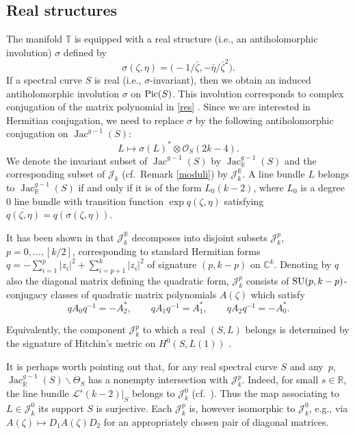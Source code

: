 \documentclass[pdftex]{sigma}
\newcommand{\cx}{{\mathbb C}}
\newcommand{\Jac}{\operatorname{Jac}}
\newcommand{\ol}{\overline}
\numberwithin{equation}{section}
\newcommand{\oR}{{\mathbb{R}}}
\newcommand{\oT}{{\mathbb{T}}}
\newcommand{\sO}{{\mathcal{O}}}
\begin{document}
\subsection{Real structures} The manifold $\oT$ is equipped with a real structure (i.e., an antiholomorphic involution) $\sigma$ defined by
\[
\sigma(\zeta,\eta)=\bigl(-1/\bar\zeta,-\bar\eta/\bar\zeta^2\bigr).
\]
If a spectral curve $S$ is real (i.e., $\sigma$-invariant), then we obtain an induced antiholomorphic involution $\sigma$ on ${\rm Pic}(S)$. This involution corresponds to complex conjugation of the matrix polynomial in \eqref{res} \cite[Section~1.2]{theta}. Since we are interested in Hermitian conjugation, we need to replace $\sigma$ by the following antiholomorphic conjugation on $\Jac^{g-1}(S)$:
\[
L\mapsto\sigma(L)^\ast\otimes \sO_S(2k-4).
\]
We denote the invariant subset of $\Jac^{g-1}(S)$ by $\Jac^{g-1}_\oR(S)$ and the corresponding subset of $\mathscr{J}_k$ (cf.\ Remark \ref{moduli})
by $\mathscr{J}_k^\oR$. A line bundle $L$ belongs to $\Jac^{g-1}_\oR(S)$ if and only if it is of the form $L_0(k-2)$, where $L_0$ is a degree $0$ line bundle with transition function $\exp q(\zeta,\eta)$ satisfying $\ol{q(\zeta,\eta)}=q(\sigma(\zeta,\eta))$.

It has been shown in \cite[Proposition~1.7]{theta} that $\mathscr{J}_k^\oR$ decomposes into disjoint subsets $\mathscr{J}_k^p$, $p=0,\dots,[k/2]$,
corresponding to standard Hermitian forms $q=-\sum_{i=1}^p |z_i|^2+\sum_{i=p+1}^k|z_i|^2$ of signature $(p,k-p)$ on $\cx^k$. Denoting by $q$ also the diagonal matrix defining the quadratic form, $\mathscr{J}_k^p$ consists of ${\rm SU}(p,k-p)$-conjugacy classes of quadratic matrix polynomials $A(\zeta)$ which satisfy
\[
qA_0q^{-1}=-A_2^\ast,\qquad qA_1q^{-1}=A_1^\ast,\qquad qA_2q^{-1}=-A_0^\ast.
\]

\begin{Remark} Equivalently, the component $\mathscr{J}_k^p$ to which a real $(S,L)$ belongs is determined by the signature of Hitchin's metric on $H^0(S,L(1))$ \cite[Section~6]{Hit}.
\end{Remark}
\begin{Remark} It is perhaps worth pointing out that, for any real spectral curve $S$ and any~$p$, $\Jac^{g-1}_\oR(S)\backslash \Theta_S$ has a nonempty intersection with $\mathscr{J}_k^p$. Indeed, for small $s\in \oR$, the line bundle $\mathscr{L}^s(k-2)|_S$ belongs to $\mathscr{J}_k^0$ (cf.~\cite[paragraph after formula~(6.11)]{Hit}). Thus the map associating to $L\in \mathscr{J}_k^0$ its support $S$ is surjective. Each $\mathscr{J}_k^p$ is, however isomorphic to $\mathscr{J}_k^0$, e.g., via $A(\zeta)\mapsto D_1A(\zeta)D_2$ for an appropriately chosen pair of diagonal matrices.
\end{Remark}
\end{document}
